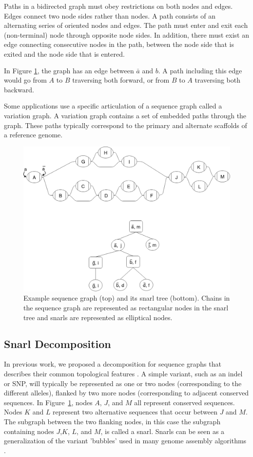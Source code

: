 \documentclass[11pt]{ucscthesis}
\begin{document}
Paths in a bidirected graph must obey restrictions on both nodes and edges.
Edges connect two node sides rather than nodes.
A path consists of an alternating series of oriented nodes and edges.
The path must enter and exit each (non-terminal) node through opposite node sides.
In addition, there must exist an edge connecting consecutive nodes in the path, between the node side that is exited and the node side that is entered.

In Figure \ref{fig:aim1_examplegraph}, the graph has an edge between $\bar{a}$ and $b$.
A path including this edge would go from $A$ to $B$ traversing both forward, or from $B$ to $A$ traversing both backward.
    
Some applications use a specific articulation of a sequence graph called a variation graph.
A variation graph contains a set of embedded paths through the graph.
These paths typically correspond to the primary and alternate scaffolds of a reference genome.

\begin{figure}
\centering
\includegraphics[width=0.8\columnwidth]{aim1_examplegraph.png}
\caption[Snarl tree example]{Example sequence graph (top) and its snarl tree (bottom). Chains in the sequence graph are represented as rectangular nodes in the snarl tree and snarls are represented as elliptical nodes.}
\label{fig:aim1_examplegraph}
\end{figure}

\subsection{Snarl Decomposition}
In previous work, we proposed a decomposition for sequence graphs that describes their common topological features \cite{paten_superbubbles_2018}. 
A simple variant, such as an indel or SNP, will typically be represented as one or two nodes (corresponding to the different alleles), flanked by two more nodes (corresponding to adjacent conserved sequences. 
In Figure~\ref{fig:aim1_examplegraph}, nodes $A$, $J$, and $M$ all represent conserved sequences.
Nodes $K$ and $L$ represent two alternative sequences that occur between $J$ and $M$.
The subgraph between the two flanking nodes, in this case the subgraph containing nodes $J$,$K$, $L$, and $M$, is called a snarl.
Snarls can be seen as a generalization of the variant 'bubbles' used in many genome assembly algorithms \cite{paten_superbubbles_2018}.
\end{document}
